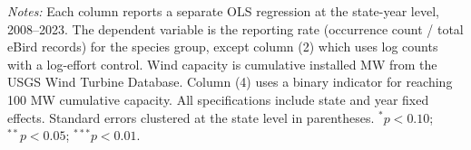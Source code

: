 \begin{table}[htbp]
\begin{tablenotes}[flushleft]\footnotesize
\item \textit{Notes:} Each column reports a separate OLS regression at the state-year level, 2008--2023. The dependent variable is the reporting rate (occurrence count / total eBird records) for the species group, except column (2) which uses log counts with a log-effort control. Wind capacity is cumulative installed MW from the USGS Wind Turbine Database. Column (4) uses a binary indicator for reaching 100 MW cumulative capacity. All specifications include state and year fixed effects. Standard errors clustered at the state level in parentheses. $^{*}p<0.10$; $^{**}p<0.05$; $^{***}p<0.01$.
\end{tablenotes}
\end{table}
